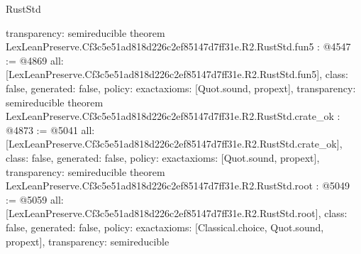 \begin{lexlean}{RustStd}
\begin{coremodule}
{  transparency: semireducible
}
theorem LexLeanPreserve.Cf3c5e51ad818d226c2ef85147d7ff31e.R2.RustStd.fun5 : @4547 := @4869 {
  all: [LexLeanPreserve.Cf3c5e51ad818d226c2ef85147d7ff31e.R2.RustStd.fun5],
  class: false,
  generated: false,
  policy: exact{axioms: [Quot.sound, propext]},
  transparency: semireducible
}
theorem LexLeanPreserve.Cf3c5e51ad818d226c2ef85147d7ff31e.R2.RustStd.crate_ok : @4873 := @5041 {
  all: [LexLeanPreserve.Cf3c5e51ad818d226c2ef85147d7ff31e.R2.RustStd.crate_ok],
  class: false,
  generated: false,
  policy: exact{axioms: [Quot.sound, propext]},
  transparency: semireducible
}
theorem LexLeanPreserve.Cf3c5e51ad818d226c2ef85147d7ff31e.R2.RustStd.root : @5049 := @5059 {
  all: [LexLeanPreserve.Cf3c5e51ad818d226c2ef85147d7ff31e.R2.RustStd.root],
  class: false,
  generated: false,
  policy: exact{axioms: [Classical.choice, Quot.sound, propext]},
  transparency: semireducible
}


\end{coremodule}
\end{lexlean}
